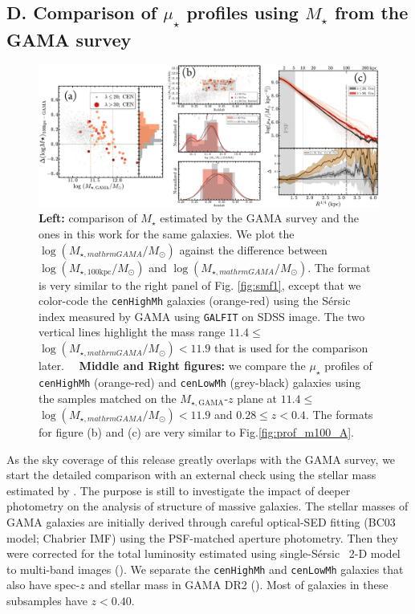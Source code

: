 \documentclass{emulateapj}
\def\galfit{{\tt GALFIT}}
\def\ser{{S\'{e}rsic\ }}
\def\rbcg{\texttt{cenHighMh}}
\def\nbcg{\texttt{cenLowMh}}
\def\mstar{{$M_{\star}$}}
\def\mgama{{$M_{\star,\mathrm{GAMA}}$}}
\def\logmtot{{$\log (M_{\star,100\mathrm{kpc}}/M_{\odot})$}}
\def\logmgama{{$\log (M_{\star,mathrm{GAMA}}/M_{\odot})$}}
\def\mden{{$\mu_{\star}$}}
\begin{document}
\begin{CJK*}{UTF8}{gbsn}

\section{D. Comparison of \mden{} profiles using \mstar{} from the GAMA survey}
    \label{app:C}

\begin{figure}[hbt!]
    \centering 
    \includegraphics[width=\textwidth]{fig/redbcg_prof_gama_new}
    \caption{\textbf{Left:} comparison of \mstar{} estimated by the GAMA survey and 
    the ones in this work for the same galaxies. 
    We plot the \logmgama{} against the difference between \logmtot{} and \logmgama{}. 
    The format is very similar to the right panel of Fig. \ref{fig:smf1}, except that
    we color-code the \rbcg{} galaxies (orange-red) using the \ser{} index measured by 
    GAMA using \galfit{} on SDSS image. 
    The two vertical lines highlight the mass range $11.4 \leq$\logmgama{}$<11.9$ that
    is used for the comparison later.~~
    \textbf{Middle and Right figures:} we compare the \mden{} profiles of \rbcg{} 
    (orange-red) and \nbcg{} (grey-black) galaxies using the samples matched on the 
    \mgama{}-$z$ plane at $11.4 \leq$\logmgama{}$<11.9$ and $0.28 \leq z < 0.4$. 
    The formats for figure (b) and (c) are very similar to Fig.\ref{fig:prof_m100_A}.}
    \label{figure:C1}
\end{figure}

    As the sky coverage of this release greatly overlaps with the GAMA survey,
    we start the detailed comparison with an external check using the stellar
    mass estimated by \citep{Taylor2011}. 
    The purpose is still to investigate the impact of deeper photometry on 
    the analysis of structure of massive galaxies.  
    The stellar masses of GAMA galaxies are initially derived through careful 
    optical-SED fitting (BC03 model; Chabrier IMF) using the PSF-matched 
    aperture photometry.  
    Then they were corrected for the total luminosity estimated using single-\ser{}
    2-D model to multi-band images (\citealt{Kelvin2012}).  
    We separate the \rbcg{} and \nbcg{} galaxies that also have 
    spec-$z$ and stellar mass in GAMA DR2 (\citealt{Liske2015}).
    Most of galaxies in these subsamples have $z < 0.40$. 
    

\end{CJK*}
\end{document}
